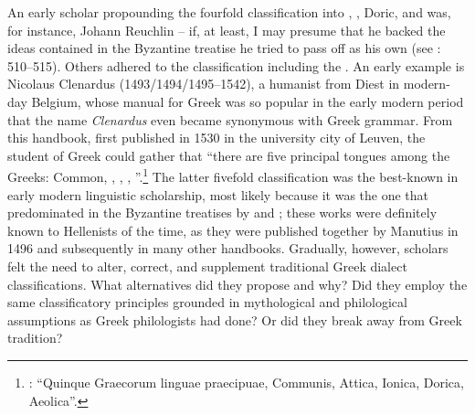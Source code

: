 An early scholar propounding the fourfold classification into , , Dor\-ic, and  was, for instance, Johann Reuchlin – if, at least, I may presume that he backed the ideas contained in the Byzantine treatise he tried to pass off as his own (see \citealt{VanRooy2014}: 510–515). Others adhered to the classification including the . An early example is Nicolaus Clenardus (1493/1494/1495–1542), a humanist from Diest in modern-day Belgium, whose manual for Greek was so popular in the early modern period that the name \textit{Clenardus} even became synonymous with Greek grammar. From this handbook, first published in 1530 in the university city of Leuven, the student of Greek could gather that “there are five principal tongues among the Greeks: Common, , , , ”.\footnote{\citet[7 (misprint for 6)]{Clenardus1530}: “Quinque Graecorum linguae praecipuae, Communis, Attica, Ionica, Dorica, Aeolica”.} The latter fivefold classification was the best-known in early modern linguistic scholarship, most likely because it was the one that predominated in the Byzantine treatises by  and ; these works were definitely known to Hellenists of the time, as they were published together by Manutius in 1496 and subsequently in many other handbooks. Gradually, however, scholars felt the need to alter, correct, and supplement traditional Greek dialect classifications. What alternatives did they propose and why? Did they employ the same classificatory principles grounded in mythological and philological assumptions as Greek philologists had done? Or did they break away from Greek tradition?

